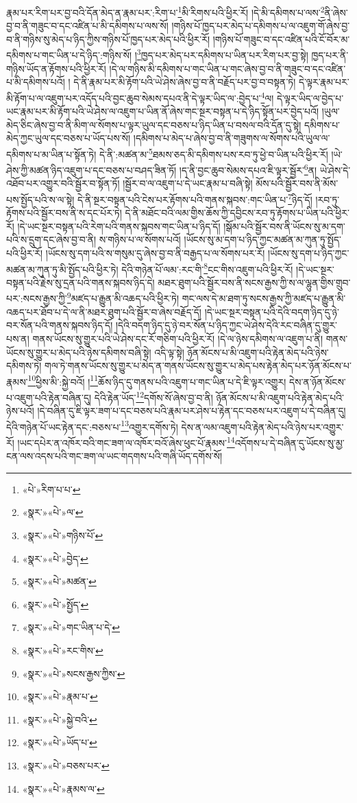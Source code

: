རྣམ་པར་རིག་པར་བྱ་བའི་དོན་མེད་ན་རྣམ་པར་:རིག་པ་\footnote{«པེ་»རིག་པ་པ་}མི་རིགས་པའི་ཕྱིར་རོ། །དེ་མི་དམིགས་པ་ལས་\footnote{«སྣར་»«པེ་»ལ་}ནི་ཞེས་བྱ་བ་ནི་གཟུང་བ་དང་འཛིན་པ་མི་དམིགས་པ་ལས་སོ། །གཉིས་པོ་ཁྱད་པར་མེད་པ་དམིགས་པ་ལ་འཇུག་གོ་ཞེས་བྱ་བ་ནི་གཉིས་སུ་མེད་པ་ཉིད་ཀྱིས་གཉིས་པོ་ཁྱད་པར་མེད་པའི་ཕྱིར་རོ། །གཉིས་པོ་གཟུང་བ་དང་འཛིན་པའི་ངོ་བོར་མ་དམིགས་པ་གང་ཡིན་པ་དེ་ཉིད་:གཉིས་སོ། །\footnote{«སྣར་»«པེ་»གཉིས་པོ་}ཁྱད་པར་མེད་པར་དམིགས་པ་ཡིན་པར་རིག་པར་བྱ་སྟེ། ཁྱད་པར་ནི་གཉིས་ཡོད་ན་རྟོགས་པའི་ཕྱིར་རོ། །དེ་ལ་གཉིས་མི་དམིགས་པ་གང་ཡིན་པ་གང་ཞེས་བྱ་བ་ནི་གཟུང་བ་དང་འཛིན་པ་མི་དམིགས་པའོ། །
དེ་ནི་རྣམ་པར་མི་རྟོག་པའི་ཡེ་ཤེས་ཞེས་བྱ་བ་ནི་བརྗོད་པར་བྱ་བ་བསྟན་ཏེ། དེ་ལྟར་རྣམ་པར་མི་རྟོག་པ་ལ་འཇུག་པར་འདོད་པའི་བྱང་ཆུབ་སེམས་དཔའ་ནི་དེ་ལྟར་ཡིད་ལ་:བྱེད་པ་\footnote{«སྣར་»«པེ་»བྱེད་}ལ། དེ་ལྟར་ཡིད་ལ་བྱེད་པ་ཡང་རྣམ་པར་མི་རྟོག་པའི་ཡེ་ཤེས་ལ་འཇུག་པ་ཡིན་ནོ་ཞེས་གང་སྔར་བསྟན་པ་དེ་ཉིད་སྟོན་པར་བྱེད་པའོ། །ཡུལ་མེད་ཅིང་ཞེས་བྱ་བ་ནི་མིག་ལ་སོགས་པ་ལྟར་ཡུལ་དང་བཅས་པ་ཉིད་ཡིན་པ་བསལ་བའི་དོན་དུ་སྟེ། དམིགས་པ་མེད་ཀྱང་ཡུལ་དང་བཅས་པ་ཡོད་པས་སོ། །དམིགས་པ་མེད་པ་ཞེས་བྱ་བ་ནི་གཟུགས་ལ་སོགས་པའི་ཡུལ་ལ་དམིགས་པ་མ་ཡིན་པ་སྟོན་ཏེ། དེ་ནི་:མཚན་མ་\footnote{«སྣར་»«པེ་»མཚན་}ཐམས་ཅད་མི་དམིགས་པས་རབ་ཏུ་ཕྱེ་བ་ཡིན་པའི་ཕྱིར་རོ། །ཡེ་ཤེས་ཀྱི་མཚན་ཉིད་འཇུག་པ་དང་བཅས་པ་བཤད་ཟིན་ཏོ། །ད་ནི་བྱང་ཆུབ་སེམས་དཔའ་ཇི་ལྟར་སྦྱོར་\footnote{«སྣར་»«པེ་»སྤྱོད་}ན། ཡེ་ཤེས་དེ་འཐོབ་པར་འགྱུར་བའི་སྦྱོར་བ་སྟོན་ཏོ། །སྦྱོར་བ་ལ་འཇུག་པ་དེ་ཡང་རྣམ་པ་བཞི་སྟེ། མོས་པའི་སྦྱོར་བས་ནི་མོས་པས་སྤྱོད་པའི་ས་ལ་སྟེ། དེ་ནི་སྔར་བསྟན་པའི་ངེས་པར་རྟོགས་པའི་གནས་སྐབས་:གང་ཡིན་པ་\footnote{«སྣར་»«པེ་»གང་ཡིན་པ་དེ་}ཉིད་དོ། །རབ་ཏུ་རྟོགས་པའི་སྦྱོར་བས་ནི་ས་དང་པོར་ཏེ། དེ་ནི་མཐོང་བའི་ལམ་གྱིས་ཆོས་ཀྱི་དབྱིངས་རབ་ཏུ་རྟོགས་པ་ཡིན་པའི་ཕྱིར་རོ། །དེ་ཡང་སྔར་བསྟན་པའི་རེག་པའི་གནས་སྐབས་གང་ཡིན་པ་ཉིད་དོ། །སྒོམ་པའི་སྦྱོར་བས་ནི་ཡོངས་སུ་མ་དག་པའི་ས་དྲུག་དང་ཞེས་བྱ་བ་ནི། ས་གཉིས་པ་ལ་སོགས་པའོ། །ཡོངས་སུ་མ་དག་པ་ཉིད་ཀྱང་མཚན་མ་ཀུན་ཏུ་སྤྱོད་པའི་ཕྱིར་རོ། །ཡོངས་སུ་དག་པའི་ས་གསུམ་དུ་ཞེས་བྱ་བ་ནི་བརྒྱད་པ་ལ་སོགས་པར་རོ། །ཡོངས་སུ་དག་པ་ཉིད་ཀྱང་མཚན་མ་ཀུན་ཏུ་མི་སྤྱོད་པའི་ཕྱིར་ཏེ། དེའི་གཉེན་པོ་ལམ་:རང་གི་\footnote{«སྣར་»«པེ་»རང་གིས་}ངང་གིས་འཇུག་པའི་ཕྱིར་རོ། །དེ་ཡང་སྔར་བསྟན་པའི་རྗེས་སུ་དྲན་པའི་གནས་སྐབས་ཉིད་དེ། མཐར་ཐུག་པའི་སྦྱོར་བས་ནི་སངས་རྒྱས་ཀྱི་ས་ལ་ལྷུན་གྱིས་གྲུབ་པར་:སངས་རྒྱས་ཀྱི་\footnote{«སྣར་»«པེ་»སངས་རྒྱས་ཀྱིས་}མཛད་པ་རྒྱུན་མི་འཆད་པའི་ཕྱིར་ཏེ། གང་ལས་དེ་མ་ཐག་ཏུ་སངས་རྒྱས་ཀྱི་མཛད་པ་རྒྱུན་མི་འཆད་པར་ཐོབ་པ་དེ་ལ་ནི་མཐར་ཐུག་པའི་སྦྱོར་བ་ཞེས་བརྗོད་དོ། །དེ་ཡང་སྔར་བསྟན་པའི་དེའི་བདག་ཉིད་དུ་ཉེ་བར་སོན་པའི་གནས་སྐབས་ཉིད་དོ། །དེའི་བདག་ཉིད་དུ་ཉེ་བར་སོན་པ་ཉིད་ཀྱང་ཡེ་ཤེས་དེའི་རང་བཞིན་དུ་གྱུར་པས་ན། གནས་ཡོངས་སུ་གྱུར་པའི་ཡེ་ཤེས་དང་རོ་གཅིག་པའི་ཕྱིར་རོ། །དེ་ལ་ཉེས་དམིགས་ལ་འཇུག་པ་ནི། གནས་ཡོངས་སུ་གྱུར་པ་མེད་པའི་ཉེས་དམིགས་བཞི་སྟེ། འདི་ལྟ་སྟེ། ཉོན་མོངས་པ་མི་འཇུག་པའི་རྟེན་མེད་པའི་ཉེས་དམིགས་ཏེ། གལ་ཏེ་གནས་ཡོངས་སུ་གྱུར་པ་མེད་ན་གནས་ཡོངས་སུ་གྱུར་པ་མེད་པས་རྟེན་མེད་པར་ཉོན་མོངས་པ་རྣམས་\footnote{«སྣར་»«པེ་»རྣམ་པ་}ཕྱིས་མི་:སྐྱེ་བའོ། །\footnote{«སྣར་»«པེ་»སྐྱེ་བའི་}ཆོས་ཉིད་དུ་གནས་པའི་འཇུག་པ་གང་ཡིན་པ་དེ་ཇི་ལྟར་འགྱུར། དེས་ན་ཉོན་མོངས་པ་འཇུག་པའི་རྟེན་བཞིན་དུ། དེའི་རྟེན་ཡོད་\footnote{«སྣར་»«པེ་»ཡོད་པ་}དགོས་སོ་ཞེས་བྱ་བ་ནི། ཉོན་མོངས་པ་མི་འཇུག་པའི་རྟེན་མེད་པའི་ཉེས་པའོ། །དེ་བཞིན་དུ་ཇི་ལྟར་ཟག་པ་དང་བཅས་པའི་རྣམ་པར་ཤེས་པ་རྟེན་དང་བཅས་པར་འཇུག་པ་དེ་བཞིན་དུ། དེའི་གཉེན་པོ་ཡང་རྟེན་དང་:བཅས་པ་\footnote{«སྣར་»«པེ་»བཅས་པར་}འགྱུར་དགོས་ཏེ། དེས་ན་ལམ་འཇུག་པའི་རྟེན་མེད་པའི་ཉེས་པར་འགྱུར་རོ། །ཡང་དཔེར་ན་འཁོར་བའི་གང་ཟག་ལ་འཁོར་བའོ་ཞེས་ཕུང་པོ་རྣམས་\footnote{«སྣར་»«པེ་»རྣམས་ལ་}འདོགས་པ་དེ་བཞིན་དུ་ཡོངས་སུ་མྱ་ངན་ལས་འདས་པའི་གང་ཟག་ལ་ཡང་གདགས་པའི་གཞི་ཡོད་དགོས་སོ། 